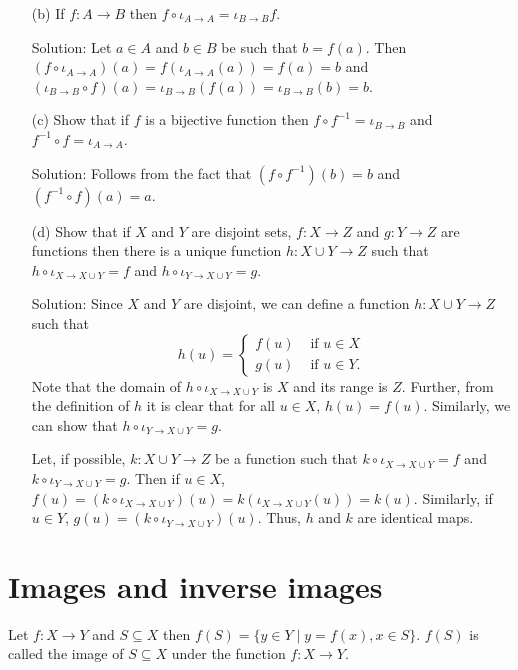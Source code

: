 \begin{enumerate}
\begin{enumerate}
\item[(b)] If $f: A \rightarrow B$ then $f \circ \iota_{A \rightarrow A} = 
\iota_{B \rightarrow B}f$.
\item[Solution:] Let $a \in A$ and $b \in B$ be such that $b = f(a)$.
Then $(f \circ \iota_{A \rightarrow A})(a) = f(\iota_{A \rightarrow A}(a))
= f(a) = b$ and $(\iota_{B \rightarrow B} \circ f)(a) = 
\iota_{B \rightarrow B}(f(a)) = \iota_{B \rightarrow B}(b) = b$.

\item[(c)] Show that if $f$ is a bijective function then $f \circ f^{-1}
= \iota_{B \rightarrow B}$ and $f^{-1} \circ f = \iota_{A \rightarrow A}$.
\item[Solution:] Follows from the fact that $(f \circ f^{-1})(b) = b$ and
$(f^{-1} \circ f)(a) = a$.

\item[(d)] Show that if $X$ and $Y$ are disjoint sets, $f: X \rightarrow Z$
and $g: Y \rightarrow Z$ are functions then there is a unique function
$h: X \cup Y \rightarrow Z$ such that $h \circ \iota_{X \rightarrow X \cup
Y} = f$ and $h \circ \iota_{Y \rightarrow X \cup Y} = g$.
\item[Solution:] Since $X$ and $Y$ are disjoint, we can define a function
$h: X \cup Y \rightarrow Z$ such that
\[
h(u) = 
\begin{cases} f(u) & \text{ if } u \in X \\
g(u) & \text{ if } u \in Y.
\end{cases}
\]
Note that the domain of $h \circ \iota_{X \rightarrow X \cup Y}$ is $X$
and its range is $Z$. Further, from the definition of $h$ it is clear that
for all $u \in X$, $h(u) = f(u)$. Similarly, we can show that $h \circ
\iota_{Y \rightarrow X \cup Y} = g$.

Let, if possible, $k: X \cup Y \rightarrow Z$ be a function such that $k
\circ \iota_{X \rightarrow X \cup Y} = f$ and $k \circ
\iota_{Y \rightarrow X \cup Y} = g$. Then if $u \in X$, $f(u) = (k \circ 
\iota_{X \rightarrow X \cup Y})(u) = k(\iota_{X \rightarrow X \cup Y}(u))
= k(u)$. Similarly, if $u \in Y$, $g(u) = (k \circ 
\iota_{Y \rightarrow X \cup Y})(u)$. Thus, $h$ and $k$ are identical maps.
\end{enumerate}
\end{enumerate}

\section{Images and inverse images}\label{c2s4}
\begin{defn}\label{c2s4d1}
Let $f: X \rightarrow Y$ and $S \subseteq X$ then $f(S) = \{y \in Y\;|\;
y = f(x), x \in S\}$. $f(S)$ is called the image of $S \subseteq X$ under
the function $f: X \rightarrow Y$.
\end{defn}


